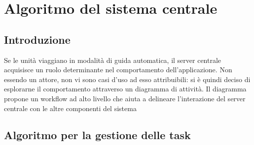 \section{Algoritmo del sistema centrale}
\subsection{Introduzione}
Se le unità viaggiano in modalità di guida automatica, il server centrale acquisisce un ruolo determinante nel comportamento dell'applicazione. Non essendo un attore, non vi sono casi d'uso ad esso attribuibili: si è quindi deciso di esplorarne il comportamento attraverso un diagramma di attività. Il diagramma propone un workflow ad alto livello che aiuta a delineare l'interazione del server centrale con le altre componenti del sistema

\subsection{Algoritmo per la gestione delle task}

